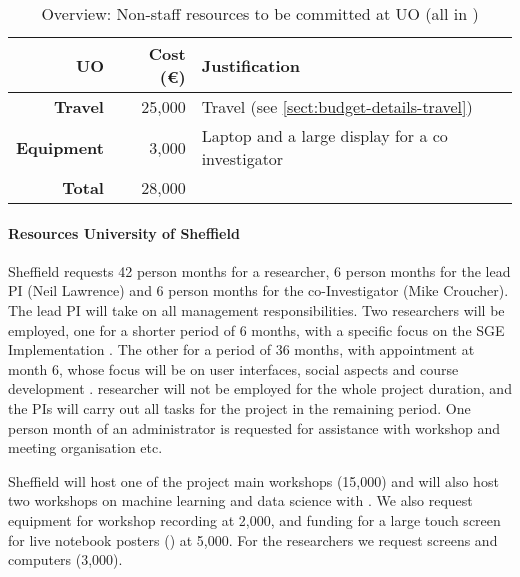 \bigskip
\begin{table}[H]
\begin{tabular}{|r|r|p{8.5cm}|}
\hline
\textbf{UO} & \textbf{Cost (\euro)} & \textbf{Justification} \\\hline
\textbf{Travel} & 25,000 & Travel (see \ref{sect:budget-details-travel})\\\hline
\textbf{Equipment} & 3,000 & Laptop and a large display for a co investigator \\\hline    %

\textbf{Total} & 28,000\\\cline{1-2}
\end{tabular}
\caption{Overview: Non-staff resources to be committed at UO (all in \texteuro)}\vspace*{-1em}
\end{table}




\paragraph{Resources University of Sheffield}

Sheffield requests 42 person months for a researcher, 6 person months
for the lead PI (Neil Lawrence) and 6 person months for the
co-Investigator (Mike Croucher). The lead PI will take on all
management responsibilities. Two researchers will be employed, one for
a shorter period of 6 months, with a specific focus on the SGE
Implementation . The other for a period of
36 months, with appointment at month 6, whose focus will be on user
interfaces, social aspects  and
course development .  researcher will
not be employed for the whole project duration, and the PIs will carry
out all tasks for the project in the remaining period. One person
month of an administrator is requested for assistance with workshop
and meeting organisation etc.

Sheffield will host one of the project main workshops (15,000) and will also host two
workshops on machine learning and data science with \TheProject. We also request equipment
for workshop recording at 2,000, and funding for a large touch screen for live notebook
posters () at 5,000. For the researchers we
request screens and computers (3,000).

